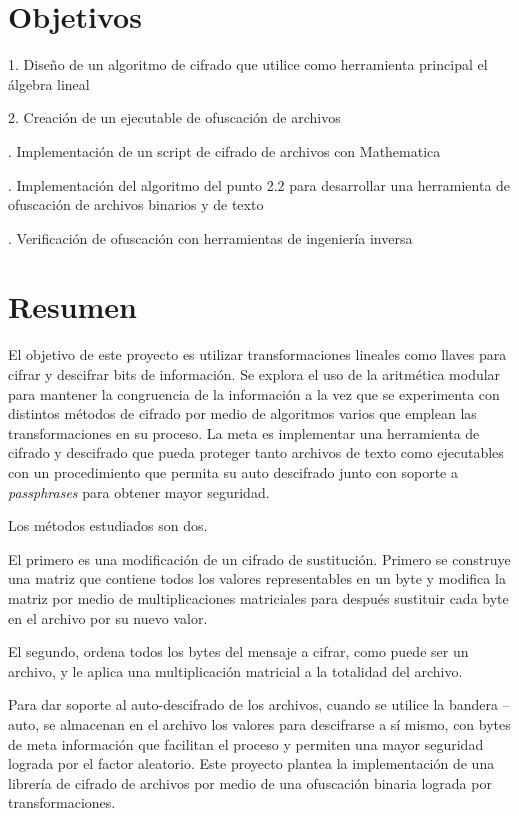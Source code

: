 \documentclass[a4paper]{article}
\begin{document}
\vfill

\newpage
\tableofcontents

\newpage
\section{Objetivos}

1. Diseño de un algoritmo de cifrado que utilice como herramienta principal el
álgebra lineal

2. Creación de un ejecutable de ofuscación de archivos

. Implementación de un script de cifrado de archivos con Mathematica

. Implementación del algoritmo del punto 2.2 para desarrollar una herramienta de 
ofuscación
de
archivos
binarios
y
de
texto 

. Verificación de ofuscación con herramientas de ingeniería inversa

\section{Resumen}

El objetivo de este proyecto es utilizar transformaciones lineales como llaves
para cifrar y descifrar bits de información.
Se explora el uso de la aritmética modular para mantener la congruencia de la
información
 a la vez que se experimenta con distintos métodos de cifrado por medio de
algoritmos varios que emplean las transformaciones en su proceso.
La meta es implementar una herramienta de cifrado y descifrado que pueda
proteger tanto archivos de texto como ejecutables con un procedimiento
que permita su auto descifrado junto con soporte a \textit{passphrases} para
obtener mayor seguridad.

Los métodos estudiados son dos. 

El primero es una modificación de un cifrado de sustitución. Primero se
construye una matriz que contiene todos los valores representables en un 
byte y modifica la matriz por medio de multiplicaciones matriciales para
después sustituir cada byte en el archivo por su nuevo valor. 

El segundo, ordena todos los bytes del mensaje a cifrar, como puede ser un
archivo, y le aplica una multiplicación matricial a la totalidad del archivo. 

Para dar soporte al auto-descifrado de los archivos, cuando se utilice la
bandera --auto, se almacenan en el archivo los valores para descifrarse a sí
mismo, 
con bytes de meta información que facilitan el proceso y permiten una mayor
seguridad lograda por el factor aleatorio. Este proyecto plantea la
implementación 
de una librería de cifrado de archivos por medio de una ofuscación binaria
lograda por transformaciones.
\end{document}

